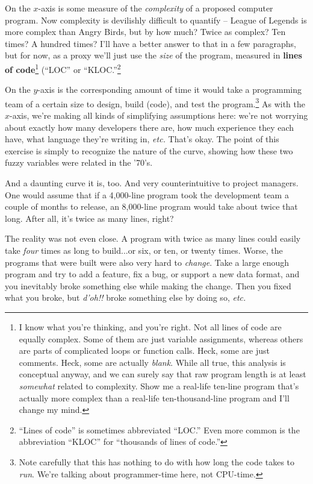 On the $x$-axis is some measure of the \textit{complexity} of a proposed
computer program. Now complexity is devilishly difficult to quantify -- League
of Legends is more complex than Angry Birds, but by how much? Twice as
complex? Ten times? A hundred times? I'll have a better answer to that in a
few paragraphs, but for now, as a proxy we'll just use the \textit{size} of
the program, measured in \textbf{lines of code}\footnote{I know what you're
thinking, and you're right. Not all lines of code are equally complex. Some of
them are just variable assignments, whereas others are parts of complicated
loops or function calls. Heck, some are just comments. Heck, some are actually
\textit{blank}. While all true, this analysis is conceptual anyway, and we can
surely say that raw program length is at least \textit{somewhat} related to
complexity. Show me a real-life ten-line program that's actually more complex
than a real-life ten-thousand-line program and I'll change my mind.} (``LOC''
or ``KLOC.''\footnote{``Lines of code'' is sometimes abbreviated ``LOC.'' Even
more common is the abbreviation ``KLOC'' for ``thousands of lines of code.''}

On the $y$-axis is the corresponding amount of time it would take a
programming team of a certain size to design, build (code), and test the
program.\footnote{Note carefully that this has nothing to do with how long the
code takes to \textit{run}. We're talking about programmer-time here, not
CPU-time.} As with the $x$-axis, we're making all kinds of simplifying
assumptions here: we're not worrying about exactly how many developers
there are, how much experience they each have, what language they're writing
in, \textit{etc.} That's okay. The point of this exercise is simply to
recognize the nature of the curve, showing how these two fuzzy variables were
related in the '70's.

And a daunting curve it is, too. And very counterintuitive to project
managers. One would assume that if a 4,000-line program took the development
team a couple of months to release, an 8,000-line program would take about
twice that long. After all, it's twice as many lines, right?

The reality was not even close. A program with twice as many lines could
easily take \textit{four} times as long to build...or six, or ten, or twenty
times. Worse, the programs that were built were also very hard to
\textit{change}. Take a large enough program and try to add a feature, fix a
bug, or support a new data format, and you inevitably broke something else
while making the change. Then you fixed what you broke, but \textit{d'oh!!}
broke something else by doing so, \textit{etc.}

